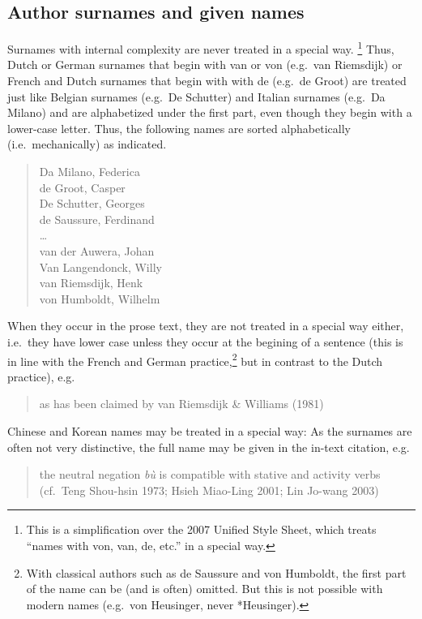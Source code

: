 \documentclass[a4paper]{article}
\newenvironment{gsrexq}{\begin{quote}\color{blue}}{\end{quote}}
\begin{document}
\subsection{Author surnames and given names}\label{sec:author-surnames-and-given-names}

Surnames with internal complexity are never treated in a special way.
\footnote{This 
  is a simplification over the 2007 Unified Style Sheet, which treats ``names with von, van, de, etc.'' in a special way.
}
Thus, Dutch or German surnames that begin with van or von (e.g.~van
Riemsdijk) or French and Dutch surnames that begin with with de (e.g.~de
Groot) are treated just like Belgian surnames (e.g.~De Schutter) and
Italian surnames (e.g.~Da Milano) and are alphabetized under the first
part, even though they begin with a lower-case letter. Thus, the
following names are sorted alphabetically (i.e.~mechanically) as
indicated. 

\begin{gsrexq}
 


Da Milano, Federica \\
de Groot, Casper\\
De Schutter, Georges \\
de Saussure, Ferdinand\\
{\dots}\\
van der Auwera, Johan\\
Van Langendonck, Willy\\
van Riemsdijk, Henk\\
von Humboldt, Wilhelm\\
\end{gsrexq}

When they occur in the prose text, they are not
treated in a special way either, i.e.~they have lower case unless they
occur at the begining of a sentence (this is in line with the French and
German practice,\footnote{With
  classical authors such as de Saussure and von Humboldt, the first part of the name can be (and is often) omitted. But this is not possible with modern names (e.g.~von Heusinger, never *Heusinger).
}
but in contrast to the Dutch practice), e.g.
\begin{gsrexq}
as has been claimed by van Riemsdijk \& Williams (1981)
\end{gsrexq}
Chinese and Korean names may
be treated in a special way: As the surnames are often not very
distinctive, the full name may be given in the in-text citation,
e.g.

\begin{gsrexq}
the neutral negation \textit{bù} is compatible with stative and activity
verbs (cf.~Teng Shou-hsin 1973; Hsieh Miao-Ling 2001; Lin Jo-wang 2003)
\end{gsrexq}
\end{document}

